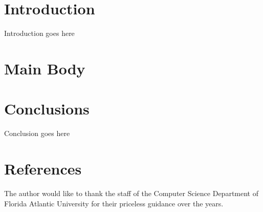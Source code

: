 \section{Introduction}


Introduction goes here

\section{Main Body}
\cite{Bahl-02}
\section{Conclusions}

Conclusion goes here



\section{References}

\begin{acks}
The author would like to thank the staff of the Computer Science Department
of Florida Atlantic University for their priceless guidance over the years.
\end{acks}



